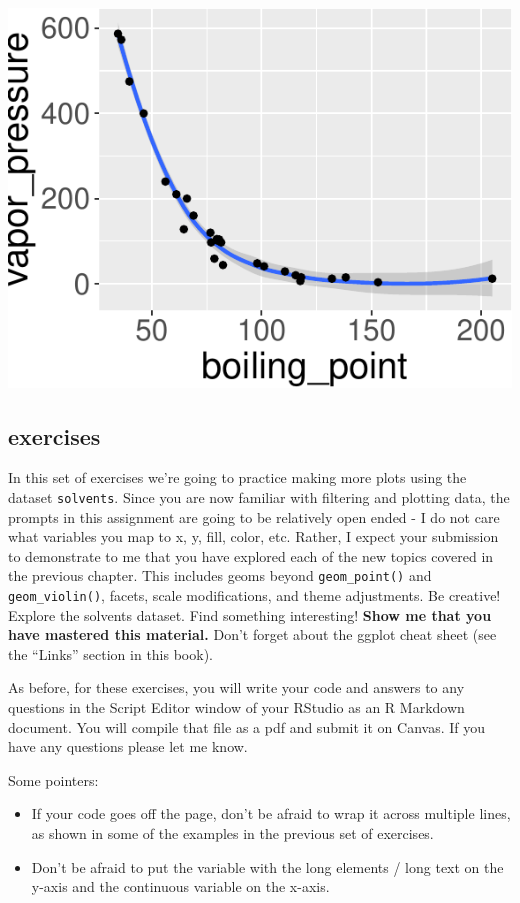 \documentclass[
]{krantz}
\begin{document}
\begin{center}\includegraphics{index_files/figure-latex/unnamed-chunk-66-1} \end{center}

\hypertarget{exercises-1}{%
\subsection{exercises}\label{exercises-1}}

In this set of exercises we're going to practice making more plots using the dataset \texttt{solvents}. Since you are now familiar with filtering and plotting data, the prompts in this assignment are going to be relatively open ended - I do not care what variables you map to x, y, fill, color, etc. Rather, I expect your submission to demonstrate to me that you have explored each of the new topics covered in the previous chapter. This includes geoms beyond \texttt{geom\_point()} and \texttt{geom\_violin()}, facets, scale modifications, and theme adjustments. Be creative! Explore the solvents dataset. Find something interesting! \textbf{Show me that you have mastered this material.} Don't forget about the ggplot cheat sheet (see the ``Links'' section in this book).

As before, for these exercises, you will write your code and answers to any questions in the Script Editor window of your RStudio as an R Markdown document. You will compile that file as a pdf and submit it on Canvas. If you have any questions please let me know.

Some pointers:

\begin{itemize}
\item
  If your code goes off the page, don't be afraid to wrap it across multiple lines, as shown in some of the examples in the previous set of exercises.
\item
  Don't be afraid to put the variable with the long elements / long text on the y-axis and the continuous variable on the x-axis.
\end{itemize}
\end{document}
